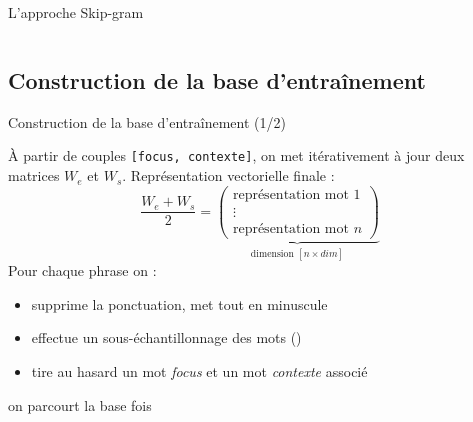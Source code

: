 \documentclass[10pt,xcolor=table,color={dvipsnames,usenames},ignorenonframetext,usepdftitle=false,french]{beamer}
\begin{document}
\begin{frame}{L'approche Skip-gram}
\begin{columns}
\begin{column}{0.4\textwidth}
\end{column}
\end{columns}

\end{frame}

\hypertarget{construction-de-la-base-dentrauxeenement}{%
\subsection{Construction de la base
d'entraînement}\label{construction-de-la-base-dentrauxeenement}}

\begin{frame}[fragile]{Construction de la base d'entraînement (1/2)}
\protect\hypertarget{construction-de-la-base-dentrauxeenement-12}{}

\bcoutil À partir de couples \texttt{{[}focus,\ contexte{]}}, on met
itérativement à jour deux matrices \(W_e\) et \(W_s\). Représentation
vectorielle finale : \[
\frac{W_e+W_s}{2}=\underbrace{
\begin{pmatrix}
\text{représentation mot 1} \\ \vdots
\\
\text{représentation mot }n 
\end{pmatrix}}_{\text{dimension }[n\times dim]}
\] \pause Pour chaque phrase on :

\begin{itemize}
\item
  supprime la ponctuation, met tout en minuscule
\item
  effectue un sous-échantillonnage des mots ()
\item
  tire au hasard un mot \emph{focus} et un mot \emph{contexte} associé
\end{itemize}

\faArrowCircleRight{} on parcourt la base  fois

\end{frame}
\end{document}

